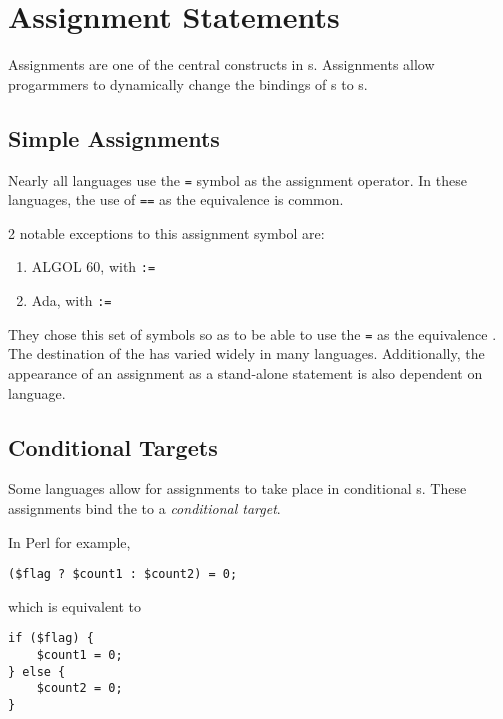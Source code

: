 \section{Assignment Statements}\label{sec:Assignment_Statement}
Assignments are one of the central constructs in s.
Assignments allow progarmmers to dynamically change the bindings of s to s.

\subsection{Simple Assignments}\label{subsec:Simple_Assignments}
Nearly all languages use the \texttt{=} symbol as the assignment operator.
In these languages, the use of \texttt{==} as the equivalence  is common.

2 notable exceptions to this assignment symbol are:
\begin{enumerate}[noitemsep]
\item ALGOL 60, with \texttt{:=}
\item Ada, with \texttt{:=}
\end{enumerate}

They chose this set of symbols so as to be able to use the \texttt{=} as the equivalence .
The destination of the  has varied widely in many languages.
Additionally, the appearance of an assignment as a stand-alone statement is also dependent on language.

\subsection{Conditional Targets}\label{subsec:Conditional_Targets}
Some languages allow for assignments to take place in conditional s.
These assignments bind the  to a \emph{conditional target}.

In Perl for example,
\begin{verbatim}
($flag ? $count1 : $count2) = 0;
\end{verbatim}
which is equivalent to
\begin{verbatim}
if ($flag) {
    $count1 = 0;
} else {
    $count2 = 0;
}
\end{verbatim}

